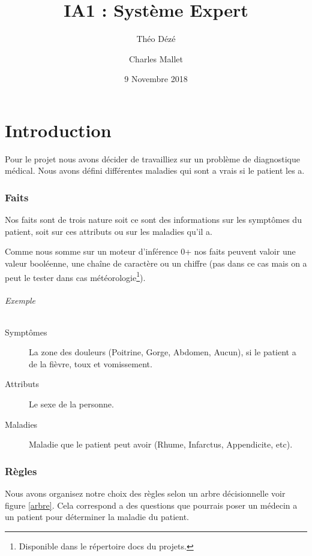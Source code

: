 \documentclass[a4paper, 11pt]{article}
\begin{document}
\title{IA1 : Système Expert}
\author{Théo Dézé \and Charles Mallet}
\date{9 Novembre 2018} 

\maketitle

\tableofcontents

\pagebreak

\part{Introduction}

Pour le projet nous avons décider de travailliez sur un problème de diagnostique médical. Nous avons défini différentes maladies qui sont a vrais si le patient les a.

\section{Faits}

Nos faits sont de trois nature soit ce sont des informations sur les symptômes du patient, soit sur ces attributs ou sur les maladies qu'il a. 

Comme nous somme sur un moteur d'inférence 0+ nos faits peuvent valoir une valeur booléenne, une chaîne de caractère ou un chiffre (pas dans ce cas mais on a peut le tester dans cas météorologie\footnote{Disponible dans le répertoire docs du projets.}).

\paragraph{Exemple}

\begin{description}
    \item[Symptômes] La zone des douleurs (Poitrine, Gorge, Abdomen, Aucun), si le patient a de la fièvre, toux et vomissement.
    \item[Attributs] Le sexe de la personne.
    \item[Maladies] Maladie que le patient peut avoir (Rhume, Infarctus, Appendicite, etc).
\end{description}

\section{Règles}

Nous avons organisez notre choix des règles selon un arbre décisionnelle voir figure \ref{arbre}. Cela correspond a des questions que pourrais poser un médecin a un patient pour déterminer la maladie du patient.
\end{document}
